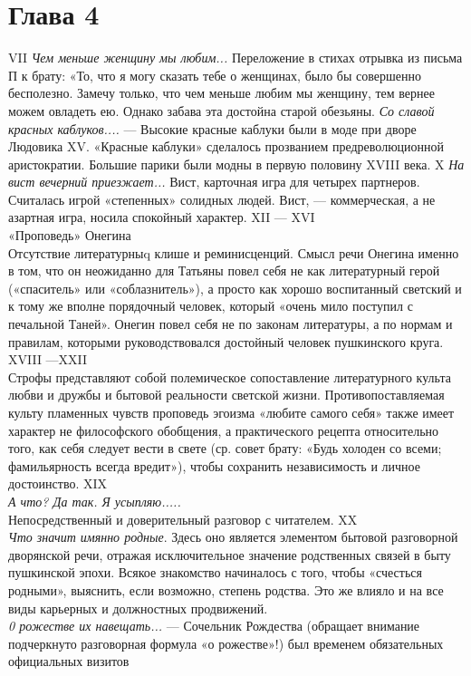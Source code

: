 \section{Глава 4}
VII
\emph{Чем меньше женщину мы любим...} Переложение в стихах отрывка из письма П к брату: «То, что я могу сказать тебе о женщинах, было бы совершенно бесполезно. Замечу только, что чем меньше любим мы женщину, тем вернее можем овладеть ею. Однако забава эта достойна старой обезьяны.
\emph{Со славой красных каблуков....} — Высокие красные каблуки были в моде при дворе Людовика XV. «Красные каблуки» сделалось прозванием предреволюционной аристократии. Большие парики были модны в первую половину XVIII века.
X
\emph{На вист вечерний приезжает... } Вист, карточная игра для четырех партнеров. Считалась игрой «степенных» солидных людей. Вист, — коммерческая,
а не азартная игра, носила спокойный характер.
XII — XVI\\
«Проповедь» Онегина\\
Отсутствие литературныq клише и реминисценций.
Смысл речи Онегина именно в том, что он неожиданно для Татьяны повел себя не как литературный герой («спаситель» или «соблазнитель»), а просто
как хорошо воспитанный светский и к тому же вполне порядочный человек, который «очень мило поступил с печальной Таней». Онегин повел себя не по законам литературы, а по нормам и правилам, которыми руководствовался достойный человек пушкинского круга.
XVIII —XXII\\
 Строфы представляют собой полемическое сопоставление литературного культа любви и дружбы и бытовой реальности светской жизни.
Противопоставляемая культу пламенных чувств проповедь эгоизма «любите самого себя» также имеет характер не философского обобщения, а практического рецепта относительно того, как себя следует вести в свете (ср. совет брату: «Будь холоден со всеми; фамильярность всегда вредит»), чтобы
сохранить независимость и личное достоинство.
XIX\\
\emph{А что? Да так. Я усыпляю.....}\\
Непосредственный и доверительный разговор с читателем.
XX\\
\emph{Что значит имянно родные}. Здесь оно является элементом бытовой разговорной дворянской речи, отражая
исключительное значение родственных связей в быту пушкинской эпохи. Всякое знакомство начиналось с того, чтобы «счесться родными», выяснить, если возможно, степень родства. Это же влияло и на все виды карьерных и должностных продвижений. \\
\emph{0 рожестве их навещать...} — Сочельник Рождества (обращает внимание подчеркнуто разговорная формула «о рожестве»!) был временем обязательных официальных визитов
